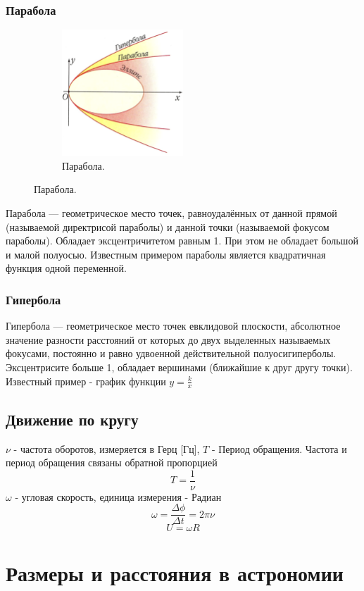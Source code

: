 \documentclass[16pt,a4paper]{report}
\begin{document}
\subsection{Парабола}
\begin{figure}[H]
    \centering
    \begin{subfigure}{0.5\textwidth}
        \centering
        \includegraphics[width=0.5\textwidth]{23250_html_71aca189.png}
        \caption{Парабола.}
        \label{fig:first}
    \end{subfigure}    
    \qquad
\end{figure}
Парабола — геометрическое место точек, равноудалённых от данной прямой
(называемой директрисой параболы) и данной точки (называемой фокусом
параболы). Обладает эксцентричитетом равным 1. При этом не обладает большой и малой полуосью.
Известным примером параболы является квадратичная функция одной переменной.
\subsection{Гипербола}
Гипербола — геометрическое место точек евклидовой плоскости, абсолютное
значение разности расстояний от которых до двух выделенных
называемых фокусами, постоянно и равно удвоенной действительной полуосигиперболы.
Эксцентрисите больше 1, обладает вершинами (ближайшие к друг другу точки). Известный пример - график функции $y = \frac{k}{x}$
\section{Движение по кругу}
$\nu$ - частота оборотов, измеряется в Герц [Гц], $T$ - Период обращения. Частота и период обращения связаны обратной пропорцией $$T = \frac{1}{\nu}$$
$\omega$ - угловая скорость, единица измерения - Радиан
$$\omega = \frac{\Delta \phi}{\Delta t}=2\pi\nu$$
$$U = \omega R$$
\chapter{Размеры и расстояния в астрономии}
\end{document}
